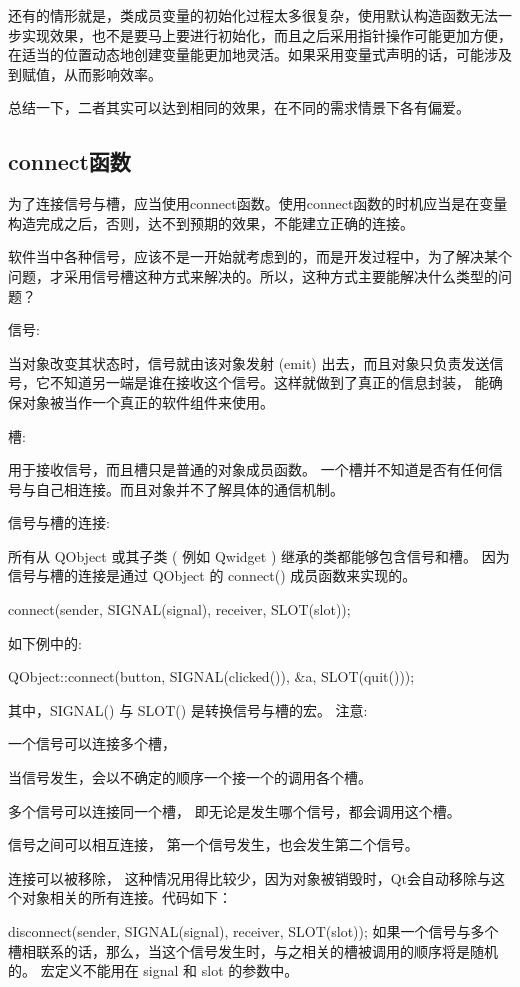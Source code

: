 还有的情形就是，类成员变量的初始化过程太多很复杂，使用默认构造函数无法一步实现效果，也不是要马上要进行初始化，而且之后采用指针操作可能更加方便，在适当的位置动态地创建变量能更加地灵活。如果采用变量式声明的话，可能涉及到赋值，从而影响效率。

总结一下，二者其实可以达到相同的效果，在不同的需求情景下各有偏爱。
\subsection{connect函数}
为了连接信号与槽，应当使用connect函数。使用connect函数的时机应当是在变量构造完成之后，否则，达不到预期的效果，不能建立正确的连接。

软件当中各种信号，应该不是一开始就考虑到的，而是开发过程中，为了解决某个问题，才采用信号槽这种方式来解决的。所以，这种方式主要能解决什么类型的问题？

信号:

当对象改变其状态时，信号就由该对象发射 (emit) 出去，而且对象只负责发送信号，它不知道另一端是谁在接收这个信号。这样就做到了真正的信息封装，
能确保对象被当作一个真正的软件组件来使用。

槽:

用于接收信号，而且槽只是普通的对象成员函数。
一个槽并不知道是否有任何信号与自己相连接。而且对象并不了解具体的通信机制。

信号与槽的连接:

所有从 QObject 或其子类 ( 例如 Qwidget ) 继承的类都能够包含信号和槽。
因为信号与槽的连接是通过 QObject 的 connect() 成员函数来实现的。

connect(sender, SIGNAL(signal), receiver, SLOT(slot));


如下例中的:

QObject::connect(button, SIGNAL(clicked()), \&a, SLOT(quit()));

其中，SIGNAL() 与 SLOT() 是转换信号与槽的宏。
注意:

一个信号可以连接多个槽，

当信号发生，会以不确定的顺序一个接一个的调用各个槽。

多个信号可以连接同一个槽，
即无论是发生哪个信号，都会调用这个槽。

信号之间可以相互连接，
第一个信号发生，也会发生第二个信号。

连接可以被移除，
这种情况用得比较少，因为对象被销毁时，Qt会自动移除与这个对象相关的所有连接。代码如下：

disconnect(sender, SIGNAL(signal), receiver, SLOT(slot));
如果一个信号与多个槽相联系的话，那么，当这个信号发生时，与之相关的槽被调用的顺序将是随机的。
宏定义不能用在 signal 和 slot 的参数中。

